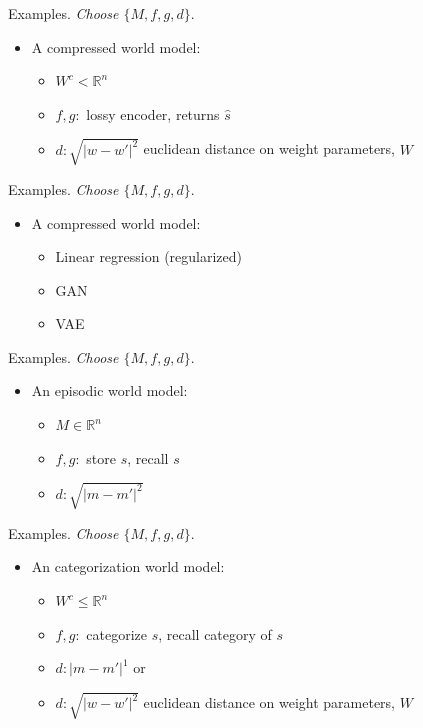 \documentclass[10pt]{beamer}
\begin{document}
\begin{frame}[fragile]{Examples.}
\textit{Choose $\{M, f, g, d\}$}.
\begin{itemize}
    \item A compressed world model:
    \begin{itemize}
        \item $W^c < \mathbb{R}^n$
        \item $f,g: $ lossy encoder, returns $\hat s$
        \item $d: \sqrt{|w - w'|^2}$ euclidean distance on weight parameters, $W$
    \end{itemize}
\end{itemize}
\end{frame}

\begin{frame}[fragile]{Examples.}
\textit{Choose $\{M, f, g, d\}$}.
\begin{itemize}
    \item A compressed world model:
    \begin{itemize}
        \item Linear regression (regularized)
        \item GAN
        \item VAE
    \end{itemize}
\end{itemize}
\end{frame}

\begin{frame}[fragile]{Examples.}
\textit{Choose $\{M, f, g, d\}$}.
\begin{itemize}
    \item An episodic world model:
    \begin{itemize}
        \item $M \in \mathbb{R}^n$
        \item $f,g: $ store $s$, recall $s$
        \item $d: \sqrt{|m - m'|^2}$ 
    \end{itemize}
\end{itemize}
\end{frame}

\begin{frame}[fragile]{Examples.}
\textit{Choose $\{M, f, g, d\}$}.
\begin{itemize}
    \item An categorization world model:
    \begin{itemize}
        \item $W^c \leq \mathbb{R}^n$
        \item $f,g: $ categorize $s$, recall category of $s$
        \item $d: |m - m'|^1$ or 
        \item $d: \sqrt{|w - w'|^2}$ euclidean distance on weight parameters, $W$
    \end{itemize}
\end{itemize}
\end{frame}
\end{document}
